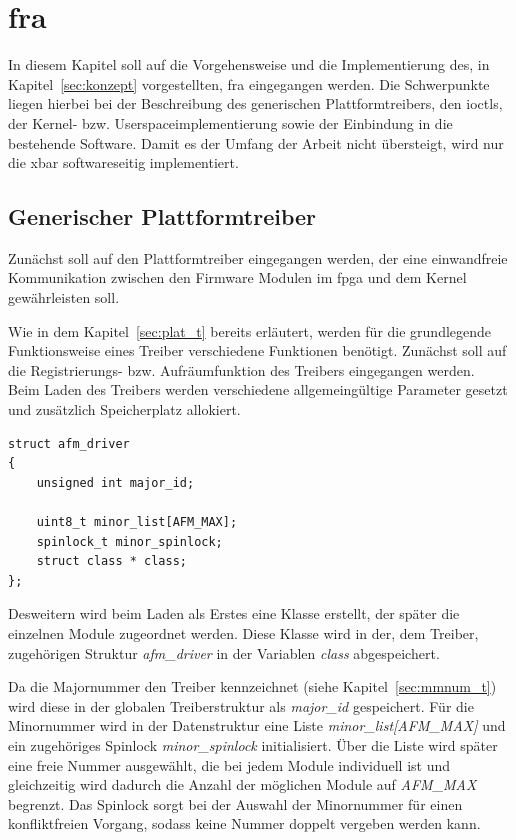 \chapter{\acl{fra}} \label{sec:haupt}
In diesem Kapitel soll auf die  Vorgehensweise und die Implementierung des, in Kapitel~\ref{sec:konzept} vorgestellten, \ac{fra} eingegangen werden. Die Schwerpunkte liegen hierbei bei der Beschreibung des generischen Plattformtreibers, den \ac{ioctl}s, der Kernel- bzw. Userspaceimplementierung sowie der Einbindung in die bestehende Software. Damit es der Umfang der Arbeit nicht übersteigt, wird nur die \ac{xbar} softwareseitig implementiert.


\section{Generischer Plattformtreiber} \label{sec:plat}
Zunächst soll auf den Plattformtreiber eingegangen werden, der eine einwandfreie Kommunikation zwischen den Firmware Modulen im \ac{fpga} und dem Kernel gewährleisten soll.


Wie in dem Kapitel~\ref{sec:plat_t} bereits erläutert, werden für die grundlegende Funktionsweise eines Treiber verschiedene Funktionen benötigt. Zunächst soll auf die Registrierungs- bzw. Aufräumfunktion des Treibers eingegangen werden.\\


Beim Laden des Treibers werden verschiedene allgemeingültige Parameter gesetzt und zusätzlich Speicherplatz allokiert. 
\begin{lstfloat}
\begin{lstlisting}
struct afm_driver
{
	unsigned int major_id;

	uint8_t minor_list[AFM_MAX];
	spinlock_t minor_spinlock;
	struct class * class;
};
\end{lstlisting}
\end{lstfloat}

Desweitern wird beim Laden als Erstes eine Klasse erstellt, der später die einzelnen Module zugeordnet werden. Diese Klasse wird in der, dem Treiber, zugehörigen Struktur \textit{afm\_driver} in der Variablen \textit{class} abgespeichert. 


Da die Majornummer den Treiber kennzeichnet (siehe Kapitel~\ref{sec:mmnum_t}) wird diese in der globalen Treiberstruktur als \textit{major\_id} gespeichert. Für die Minornummer wird in der Datenstruktur eine Liste \textit{minor\_list[AFM\_MAX]} und ein zugehöriges Spinlock \textit{minor\_spinlock} initialisiert. Über die Liste wird später eine freie Nummer ausgewählt, die bei jedem Module individuell ist und gleichzeitig wird dadurch die Anzahl der möglichen Module auf \textit{AFM\_MAX} begrenzt. Das Spinlock sorgt bei der Auswahl der Minornummer für einen konfliktfreien Vorgang, sodass keine Nummer doppelt vergeben werden kann. 


